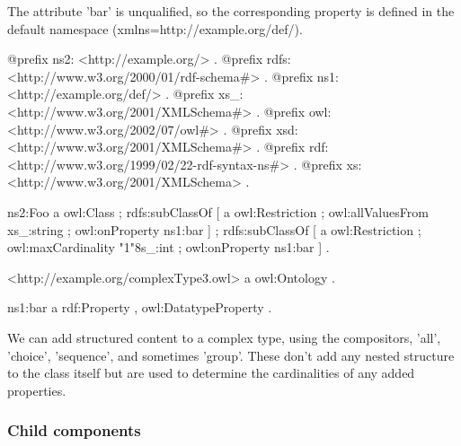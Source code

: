 The attribute 'bar' is unqualified, so the corresponding property is defined in the default namespace (xmlns=http://example.org/def/).


\begin{DoxyCodeInclude}
@prefix ns2:     <http://example.org/> .
@prefix rdfs:    <http://www.w3.org/2000/01/rdf-schema#> .
@prefix ns1:     <http://example.org/def/> .
@prefix xs_:     <http://www.w3.org/2001/XMLSchema#> .
@prefix owl:     <http://www.w3.org/2002/07/owl#> .
@prefix xsd:     <http://www.w3.org/2001/XMLSchema#> .
@prefix rdf:     <http://www.w3.org/1999/02/22-rdf-syntax-ns#> .
@prefix xs:      <http://www.w3.org/2001/XMLSchema> .

ns2:Foo
      a       owl:Class ;
      rdfs:subClassOf
              [ a       owl:Restriction ;
                owl:allValuesFrom xs_:string ;
                owl:onProperty ns1:bar
              ] ;
      rdfs:subClassOf
              [ a       owl:Restriction ;
                owl:maxCardinality "1"^^xs_:int ;
                owl:onProperty ns1:bar
              ] .

<http://example.org/complexType3.owl>
      a       owl:Ontology .

ns1:bar
      a       rdf:Property , owl:DatatypeProperty .
\end{DoxyCodeInclude}


We can add structured content to a complex type, using the compositors, 'all', 'choice', 'sequence', and sometimes 'group'. These don't add any nested structure to the class itself but are used to determine the cardinalities of any added properties.\hypertarget{complextype_complexTypeChildren}{}\subsubsection{Child components}\label{complextype_complexTypeChildren}

